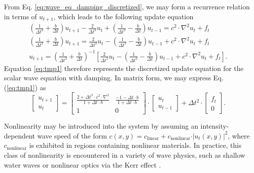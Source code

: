 From Eq. \ref{eq:wave_eq_damping_discretized}, we may form a recurrence relation in terms of $u_{t+1}$, which leads to the following update equation
\begin{align}
    \left( \frac{1}{\Delta{t}^2} + \frac{b}{\Delta{t}}\right) u_{t+1} - \frac{2}{\Delta{t}^2} u_t  + \left( \frac{1}{\Delta{t}^2} - \frac{b}{\Delta{t}} \right) u_{t-1} = c^2 \cdot \nabla^2 u_t + f_t \nonumber \\
    \left( \frac{1}{\Delta{t}^2} + \frac{b}{\Delta{t}}\right) u_{t+1} = \frac{2}{\Delta{t}^2} u_t  - \left( \frac{1}{\Delta{t}^2} - \frac{b}{\Delta{t}} \right) u_{t-1} + c^2 \cdot\nabla^2 u_t + f_t \nonumber \\
    u_{t+1} = \left( \frac{1}{\Delta{t}^2} + \frac{b}{\Delta{t}}\right)^{-1} \left[ \frac{2}{\Delta{t}^2} u_t - \left( \frac{1}{\Delta{t}^2} - \frac{b}{\Delta{t}} \right) u_{t-1} + c^2\cdot \nabla^2 u_t + f_t \right].
    \label{eq:tmp1}
\end{align}
Equation \ref{eq:tmp1} therefore represents the discretized update equation for the scalar wave equation with damping. In matrix form, we may express Eq. (\ref{eq:tmp1}) as
\begin{equation}
    \begin{bmatrix}
    u_{t+1} \\ u_t
    \end{bmatrix}
    = 
    \begin{bmatrix}
    \frac{2 + \Delta t^2\cdot c^2 \cdot \nabla^2}{1 + \Delta t\cdot b} 
    & \frac{-1 - \Delta t\cdot b}{1 + \Delta t\cdot b}  \\
    1 & 0
    \end{bmatrix}
    \cdot
    \begin{bmatrix}
    u_{t} \\ u_{t-1}
    \end{bmatrix}    
    +
    \Delta{t}^2 \cdot \begin{bmatrix}
     f_{t} \\ 0
    \end{bmatrix}.
    \label{eq:update_damped}
\end{equation}

Nonlinearity may be introduced into the system by assuming an intensity-dependent wave speed of the form $c{(x,y)} = c_{\text{linear}} + c_{\text{nonlinear}} \cdot \vert u_t{(x,y)} \vert^2$, where $c_{\text{nonlinear}}$ is exhibited in regions containing nonlinear materials.
In practice, this class of nonlinearity is encountered in a variety of wave physics, such as shallow water waves \cite{ursell_long-wave_1953} or nonlinear optics via the Kerr effect \cite{Boyd__2008}.

